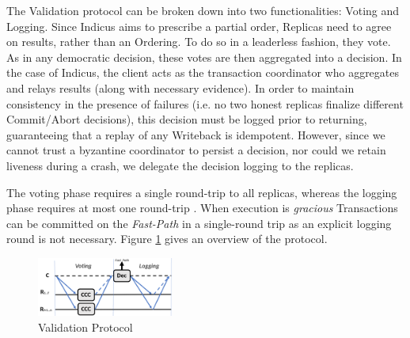 The Validation protocol can be broken down into two functionalities: Voting and Logging.
Since Indicus aims to prescribe a partial order, Replicas need to agree on results, rather than an Ordering. To do so in a leaderless fashion, they vote. As in any democratic decision, these votes are then aggregated into a decision. In the case of Indicus, the client acts as the transaction coordinator who aggregates and relays results (along with necessary evidence).
 In order to maintain consistency in the presence of failures (i.e. no two honest replicas finalize different Commit/Abort decisions), this decision must be logged prior to returning, guaranteeing that a replay of any Writeback is idempotent.  However, since we cannot trust a byzantine coordinator to persist a decision, nor could we retain liveness during a crash, we delegate the decision logging to the replicas.
 

The voting phase requires a single round-trip to all replicas, whereas the logging phase requires at most one round-trip . When execution is \textit{gracious} Transactions can be committed on the \textit{Fast-Path} in a single-round trip as an explicit logging round is not necessary. Figure \ref{fig:ValO} gives an overview of the protocol.

\begin{figure}

\includegraphics[width= 0.4\textwidth]{./figures/Validation.png}

\caption{Validation Protocol}
\label{fig:ValO}
\end{figure}

